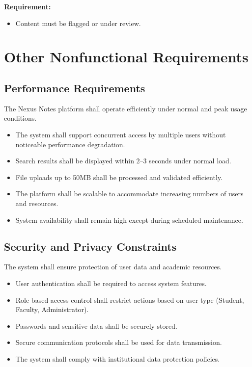 \documentclass[12pt]{article}
\begin{document}
\textbf{Requirement:}
\begin{itemize}
    \item Content must be flagged or under review.
\end{itemize}

\section{Other Nonfunctional Requirements}

\subsection{Performance Requirements}
The Nexus Notes platform shall operate efficiently under normal and peak usage conditions.

\begin{itemize}
    \item The system shall support concurrent access by multiple users without noticeable performance degradation.
    \item Search results shall be displayed within 2--3 seconds under normal load.
    \item File uploads up to 50MB shall be processed and validated efficiently.
    \item The platform shall be scalable to accommodate increasing numbers of users and resources.
    \item System availability shall remain high except during scheduled maintenance.
\end{itemize}

\subsection{Security and Privacy Constraints}
The system shall ensure protection of user data and academic resources.

\begin{itemize}
    \item User authentication shall be required to access system features.
    \item Role-based access control shall restrict actions based on user type (Student, Faculty, Administrator).
    \item Passwords and sensitive data shall be securely stored.
    \item Secure communication protocols shall be used for data transmission.
    \item The system shall comply with institutional data protection policies.
\end{itemize}
\end{document}
